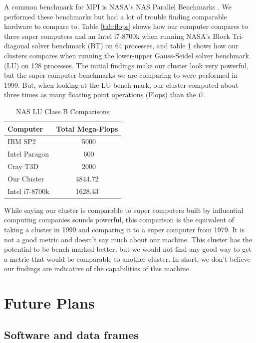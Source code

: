 \documentclass[12pt]{article}
\begin{document}
A common benchmark for MPI is NASA's NAS Parallel Benchmarks \cite{nasa}. We performed these benchmarks but had a lot of trouble finding comparable hardware to compare to. Table \ref{tab:flops} \cite{benchmark} shows how our computer compares to three super computers and an Intel i7-8700k when running NASA's Block Tri-diagonal solver benchmark (BT) on 64 processes, and table \ref{tab:flopsLU} shows how our clusters compares when running the lower-upper Gauss-Seidel solver benchmark (LU) on 128 processes. The initial findings make our cluster look very powerful, but the super computer benchmarks we are comparing to were performed in 1999. But, when looking at the LU bench mark, our cluster computed about three times as many floating point operations (Flops) than the i7. 

\begin{table}[H]
    \centering
    \begin{tabular}{lc}
        Computer & Total Mega-Flops\\
        \hline
        IBM SP2 & ~5000 \\
        Intel Paragon & ~600\\
        Cray T3D & ~2000\\
        Our Cluster & 4844.72\\
        Intel i7-8700k & 1628.43\\
    \end{tabular}
    \caption{NAS LU Class B Comparisons}
    \label{tab:flopsLU}
\end{table}

While saying our cluster is comparable to super computers built by influential computing companies sounds powerful, this comparison is the equivalent of taking a cluster in 1999 and comparing it to a super computer from 1979. It is not a good metric and doesn't say much about our machine. This cluster has the potential to be bench marked better, but we would not find any good way to get a metric that would be comparable to another cluster. In short, we don't believe our findings are indicative of the capabilities of this machine.

%
%
\section{Future Plans}

\subsection{Software and data frames}
\end{document}

